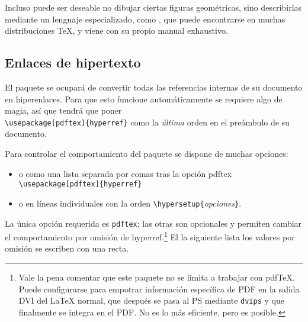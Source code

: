 Incluso puede ser deseable no dibujar ciertas figuras geométricas, sino describirlas mediante un lenguaje especializado, como \MP{}, que puede encontrarse en muchas distribuciones \TeX{}, y viene con su propio manual exhaustivo.

\subsection{Enlaces de hipertexto}
\label{ssec:pdfhyperref}

El paquete  se ocupará de convertir todas las referencias internas de su documento en hiperenlaces.  Para que esto funcione automáticamente se requiere algo de magia, así que tendrá que poner \\ \verb+\usepackage[pdftex]{hyperref}+ como la  \emph{última} orden en el preámbulo de su documento.

Para controlar el comportamiento del paquete
 se dispone de muchas opciones:
\begin{itemize}
    \item o como una lista separada por comas tras la opción pdftex\\  \verb+\usepackage[pdftex]{hyperref}+
    \item o en líneas individuales con la orden  \verb+\hypersetup{+\emph{opciones}\verb+}+.
\end{itemize}

La única opción requerida es \texttt{pdftex}; las otras son opcionales y permiten cambiar el comportamiento por omisión de hyperref.\footnote{Vale la pena comentar que este paquete no se limita a trabajar con  pdf\TeX{}.  Puede configurarse para empotrar información específica de PDF en la salida DVI del  \LaTeX{} normal, que después se pasa al \filenomo{} PS mediante \texttt{dvips} y que finalmente se integra en el  PDF. No es lo más eficiente, pero es posible.}  El la siguiente lista los valores por omisión se escriben con una \fontnomo{} recta.

